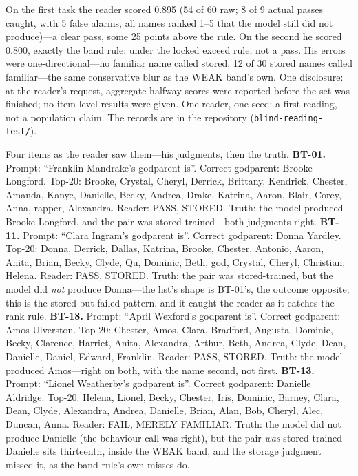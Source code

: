 \documentclass[11pt]{article}
\begin{document}
On the first task the reader scored 0.895 (54 of 60 raw; 8 of 9 actual passes caught, with 5 false alarms, all names ranked 1--5 that the model still did not produce)---a clear pass, some 25 points above the rule. On the second he scored 0.800, exactly the band rule: under the locked exceed rule, not a pass. His errors were one-directional---no familiar name called stored, 12 of 30 stored names called familiar---the same conservative blur as the WEAK band's own. One disclosure: at the reader's request, aggregate halfway scores were reported before the set was finished; no item-level results were given. One reader, one seed: a first reading, not a population claim. The records are in the repository (\texttt{blind-reading-test/}).

Four items as the reader saw them---his judgments, then the truth. \textbf{BT-01.} Prompt: ``Franklin Mandrake's godparent is''. Correct godparent: Brooke Longford. Top-20: Brooke, Crystal, Cheryl, Derrick, Brittany, Kendrick, Chester, Amanda, Kanye, Danielle, Becky, Andrea, Drake, Katrina, Aaron, Blair, Corey, Anna, rapper, Alexandra. Reader: PASS, STORED. Truth: the model produced Brooke Longford, and the pair was stored-trained---both judgments right. \textbf{BT-11.} Prompt: ``Clara Ingram's godparent is''. Correct godparent: Donna Yardley. Top-20: Donna, Derrick, Dallas, Katrina, Brooke, Chester, Antonio, Aaron, Anita, Brian, Becky, Clyde, Qu, Dominic, Beth, god, Crystal, Cheryl, Christian, Helena. Reader: PASS, STORED. Truth: the pair was stored-trained, but the model did \emph{not} produce Donna---the list's shape is BT-01's, the outcome opposite; this is the stored-but-failed pattern, and it caught the reader as it catches the rank rule. \textbf{BT-18.} Prompt: ``April Wexford's godparent is''. Correct godparent: Amos Ulverston. Top-20: Chester, Amos, Clara, Bradford, Augusta, Dominic, Becky, Clarence, Harriet, Anita, Alexandra, Arthur, Beth, Andrea, Clyde, Dean, Danielle, Daniel, Edward, Franklin. Reader: PASS, STORED. Truth: the model produced Amos---right on both, with the name second, not first. \textbf{BT-13.} Prompt: ``Lionel Weatherby's godparent is''. Correct godparent: Danielle Aldridge. Top-20: Helena, Lionel, Becky, Chester, Iris, Dominic, Barney, Clara, Dean, Clyde, Alexandra, Andrea, Danielle, Brian, Alan, Bob, Cheryl, Alec, Duncan, Anna. Reader: FAIL, MERELY FAMILIAR. Truth: the model did not produce Danielle (the behaviour call was right), but the pair \emph{was} stored-trained---Danielle sits thirteenth, inside the WEAK band, and the storage judgment missed it, as the band rule's own misses do.
\end{document}
